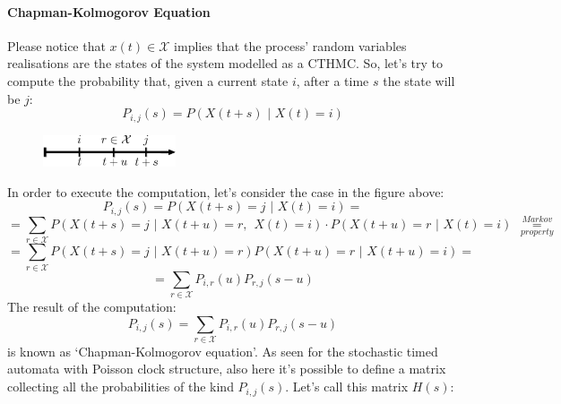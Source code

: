 \documentclass[12pt,a4paper]{article}
\begin{document}
\paragraph{Chapman-Kolmogorov Equation}
Please notice that $x(t)\in \mathcal{X}$ implies that the process' random variables realisations are the states of the system modelled as a CTHMC. So, let's try to compute the probability that, given a current state $i$, after a time $s$ the state will be $j$:
$$
P_{i,j}(s)=P\left(X\left(t+s\right)\hspace{4pt}|\hspace{4pt} X\left(t\right)=i\right)
$$
\begin{figure}[H]
\begin{center}
\includegraphics[width=0.35\textwidth]{IMG/CTHMC1.eps}
\label{Picture 3}
\end{center}
\end{figure}
\noindent
In order to execute the computation, let's consider the case in the figure above:
$$
P_{i,j}(s)=P\left(X\left(t+s\right)=j\hspace{4pt}|\hspace{4pt} X\left(t\right)=i\right)=
$$
$$
=\sum_{r\in \mathcal{X}}{
P\left(X\left(t+s\right)=j\hspace{4pt}|\hspace{4pt} X\left(t+u\right)=r,\hspace{5pt} X\left(t\right)=i\right)
}\cdot 
P\left(X\left(t+u\right)=r\hspace{4pt}|\hspace{4pt}X\left(t\right)=i\right)
\hspace{5pt}\overset{Markov}{\underset{property}{=}}
$$
$$
=\sum_{r\in \mathcal{X}}{
P\left(X\left(t+s\right)=j\hspace{4pt}|\hspace{4pt} X\left(t+u\right)=r\right)
P\left(X\left(t+u\right)=r\hspace{4pt}|\hspace{4pt} X\left(t+u\right)=i\right)
}=
$$
$$
=\sum_{r\in \mathcal{X}}{
P_{i,r}\left(u\right)
P_{r,j}\left(s-u\right)
}
$$
The result of the computation:
\begin{equation}
P_{i,j}(s)
=\sum_{r\in \mathcal{X}}{
P_{i,r}\left(u\right)
P_{r,j}\left(s-u\right)
}
\end{equation}
is known as `Chapman-Kolmogorov equation'. As seen for the stochastic timed automata with Poisson clock structure, also here it's possible to define a matrix collecting all the probabilities of the kind $P_{i,j}(s)$. Let's call this matrix $H(s)$:
\end{document}
